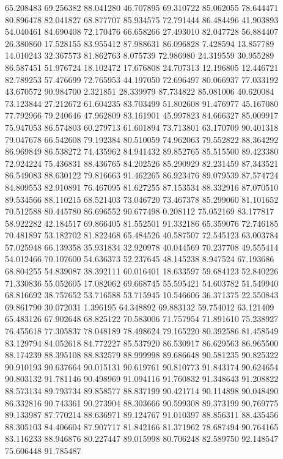 65.208483
69.256382
88.041280
46.707895
69.310722
85.062055
78.644471
80.896478
82.041827
68.877707
85.934575
72.791444
86.484496
41.903893
54.040461
84.690408
72.170476
66.658266
27.493010
82.047728
56.884407
26.380860
17.528155
83.955412
87.988631
86.096828
7.428594
13.857789
14.010243
32.367573
81.862763
8.075739
72.986980
24.319559
30.955289
86.587451
51.976724
18.102472
17.676808
24.707313
12.196805
12.446721
82.789253
57.476699
72.765953
44.197050
72.696497
80.066937
77.033192
43.670572
90.984700
2.321851
28.339979
87.734822
85.081006
40.620084
73.123844
27.212672
61.604235
83.703499
51.802608
91.476977
45.167080
77.792966
79.240646
47.962809
83.161901
45.997823
84.666327
85.009917
75.947053
86.574803
60.279713
61.601894
73.713801
63.170709
90.401318
79.047678
66.542608
79.192384
80.510059
74.962063
79.552822
88.364292
86.969849
86.538272
74.435962
84.941432
89.852765
85.515500
89.423380
72.924224
75.436831
88.436765
84.202526
85.290929
82.231459
87.343521
86.549083
88.630122
79.816663
91.462265
86.923476
89.079539
87.574724
84.809553
82.910891
76.467095
81.627255
87.153534
88.332916
87.070510
89.534566
88.110215
68.521403
73.046720
73.467378
85.299060
81.101652
70.512588
80.445780
86.696552
90.677498
0.208112
75.052169
83.177817
58.922282
42.184517
69.866405
81.552501
91.332186
65.359076
72.746185
70.481897
53.182702
81.822468
65.484526
40.587507
72.545123
63.003784
57.025948
66.139358
35.931834
32.920978
40.044569
70.237708
49.555414
54.012466
70.107600
54.636373
52.237645
48.145238
8.947524
67.193686
68.804255
54.839087
38.392111
60.016401
18.633597
59.684123
52.840226
71.330836
55.052605
17.082062
69.668745
55.595421
54.603782
51.549940
68.816692
38.757652
53.716588
53.715945
10.546606
36.371375
22.550843
69.861790
30.072031
1.396195
64.348892
69.883132
59.754012
63.121409
65.483126
67.902648
68.825122
70.583006
71.757954
71.891610
75.238927
76.455618
77.305837
78.048189
78.498624
79.165220
80.392586
81.458549
83.129794
84.052618
84.772227
85.537920
86.530917
86.629563
86.965500
88.174239
88.395108
88.832579
88.999998
89.686648
90.581235
90.825322
90.910193
90.637664
90.015131
90.619761
90.810773
91.843174
90.624654
90.803132
91.781146
90.498969
91.094116
91.760832
91.348643
91.208822
88.573134
89.793734
89.858577
88.837199
90.421714
90.114898
90.048490
86.332816
90.743361
90.273904
88.303666
90.599308
89.373199
90.769775
89.133987
87.770214
88.636971
89.124767
91.010397
88.856311
88.435456
88.305103
84.406604
87.907717
81.842166
81.371962
78.687494
90.764165
83.116233
88.946876
80.227447
89.015998
80.706248
82.589750
92.148547
75.606448
91.785487
